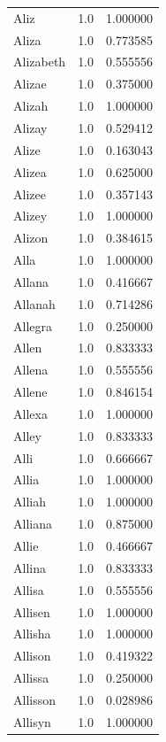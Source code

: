 \documentclass[
  letterpaper,
  DIV=11,
  numbers=noendperiod]{scrreprt}
\begin{document}
\begin{tabular}{lrr}
Aliz            &   1.0 &   1.000000 \\
Aliza           &   1.0 &   0.773585 \\
Alizabeth       &   1.0 &   0.555556 \\
Alizae          &   1.0 &   0.375000 \\
Alizah          &   1.0 &   1.000000 \\
Alizay          &   1.0 &   0.529412 \\
Alize           &   1.0 &   0.163043 \\
Alizea          &   1.0 &   0.625000 \\
Alizee          &   1.0 &   0.357143 \\
Alizey          &   1.0 &   1.000000 \\
Alizon          &   1.0 &   0.384615 \\
Alla            &   1.0 &   1.000000 \\
Allana          &   1.0 &   0.416667 \\
Allanah         &   1.0 &   0.714286 \\
Allegra         &   1.0 &   0.250000 \\
Allen           &   1.0 &   0.833333 \\
Allena          &   1.0 &   0.555556 \\
Allene          &   1.0 &   0.846154 \\
Allexa          &   1.0 &   1.000000 \\
Alley           &   1.0 &   0.833333 \\
Alli            &   1.0 &   0.666667 \\
Allia           &   1.0 &   1.000000 \\
Alliah          &   1.0 &   1.000000 \\
Alliana         &   1.0 &   0.875000 \\
Allie           &   1.0 &   0.466667 \\
Allina          &   1.0 &   0.833333 \\
Allisa          &   1.0 &   0.555556 \\
Allisen         &   1.0 &   1.000000 \\
Allisha         &   1.0 &   1.000000 \\
Allison         &   1.0 &   0.419322 \\
Allissa         &   1.0 &   0.250000 \\
Allisson        &   1.0 &   0.028986 \\
Allisyn         &   1.0 &   1.000000 \\

\end{tabular}
\end{document}
